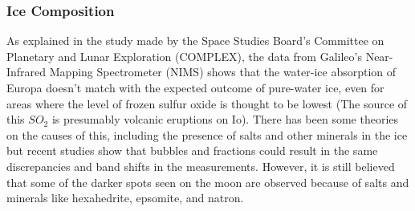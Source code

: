 \subsubsection{Ice Composition} 
As explained in the study made by the Space Studies Board's Committee on Planetary and Lunar Exploration (COMPLEX), the data from Galileo’s Near-Infrared Mapping Spectrometer (NIMS) shows that the water-ice absorption of Europa doesn't match with the expected outcome of pure-water ice, even for areas where the level of frozen sulfur oxide is thought to be lowest (The source of this $SO_2$ is presumably volcanic eruptions on Io). There has been some theories on the causes of this, including the presence of salts and other minerals in the ice but recent studies show that bubbles and fractions could result in the same discrepancies and band shifts in the measurements. However, it is still believed that some of the darker spots seen on the moon are observed because of salts and minerals like hexahedrite, epsomite, and natron\cite{SciStrat}. %
